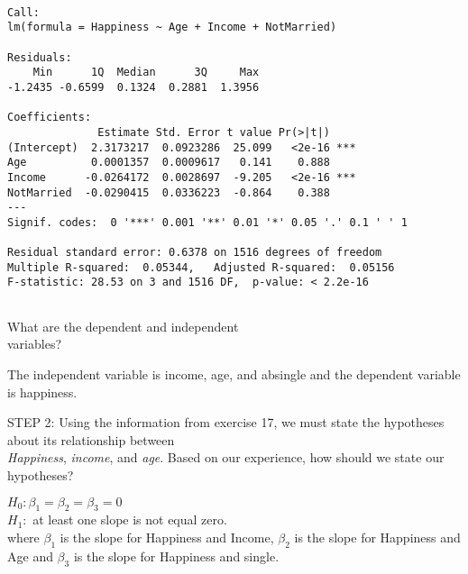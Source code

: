 \documentclass[11pt]{book}\usepackage[]{graphicx}\usepackage[]{color}
\begin{document}
\begin{exercises}
\begin{exercise}
{{}}

{\tiny{
  \begin{verbatim}

Call:
lm(formula = Happiness ~ Age + Income + NotMarried)

Residuals:
    Min      1Q  Median      3Q     Max 
-1.2435 -0.6599  0.1324  0.2881  1.3956 

Coefficients:
              Estimate Std. Error t value Pr(>|t|)    
(Intercept)  2.3173217  0.0923286  25.099   <2e-16 ***
Age          0.0001357  0.0009617   0.141    0.888    
Income      -0.0264172  0.0028697  -9.205   <2e-16 ***
NotMarried  -0.0290415  0.0336223  -0.864    0.388    
---
Signif. codes:  0 '***' 0.001 '**' 0.01 '*' 0.05 '.' 0.1 ' ' 1

Residual standard error: 0.6378 on 1516 degrees of freedom
Multiple R-squared:  0.05344,	Adjusted R-squared:  0.05156 
F-statistic: 28.53 on 3 and 1516 DF,  p-value: < 2.2e-16


  \end{verbatim}
}}

What are the dependent and independent \\ variables?

    \vspace{5mm}

    \end{exercise}
    \begin{solution}      %
       
       The independent variable is income,   age, and absingle and the dependent variable is happiness.
       
    \end{solution}

  \begin{exercise} %

    STEP 2: Using the information from exercise 17, we must state the hypotheses about its relationship between \\ {\textit{Happiness}}, {\textit{income}}, and {\textit{age}}.  Based on our experience, how should we state our hypotheses?

    \vspace{5mm}

    \end{exercise}
    \vspace{2mm}
    \begin{solution}      %

       $H_0: \beta_1 = \beta_2 = \beta_3 = 0$ \\
       $H_1:$ at least one slope is not equal zero. \\
       where $\beta_1$ is the slope for Happiness and Income,  $\beta_2$ is the slope for Happiness and Age and $\beta_3$ is         the slope for Happiness and single.


\end{solution}
\end{exercises}
\end{document}
